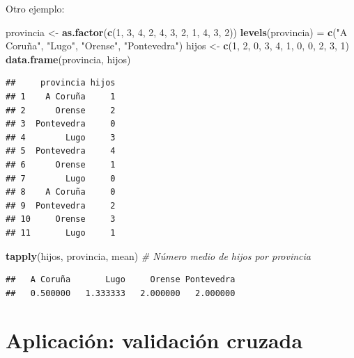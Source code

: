 \documentclass[]{book}
\newenvironment{Shaded}{\begin{snugshade}}{\end{snugshade}}
\newcommand{\KeywordTok}[1]{\textcolor[rgb]{0.13,0.29,0.53}{\textbf{#1}}}
\newcommand{\DecValTok}[1]{\textcolor[rgb]{0.00,0.00,0.81}{#1}}
\newcommand{\StringTok}[1]{\textcolor[rgb]{0.31,0.60,0.02}{#1}}
\newcommand{\CommentTok}[1]{\textcolor[rgb]{0.56,0.35,0.01}{\textit{#1}}}
\newcommand{\NormalTok}[1]{#1}
\begin{document}
Otro ejemplo:

\begin{Shaded}
\begin{Highlighting}[]
\NormalTok{provincia <-}\StringTok{ }\KeywordTok{as.factor}\NormalTok{(}\KeywordTok{c}\NormalTok{(}\DecValTok{1}\NormalTok{, }\DecValTok{3}\NormalTok{, }\DecValTok{4}\NormalTok{, }\DecValTok{2}\NormalTok{, }\DecValTok{4}\NormalTok{, }\DecValTok{3}\NormalTok{, }\DecValTok{2}\NormalTok{, }\DecValTok{1}\NormalTok{, }\DecValTok{4}\NormalTok{, }\DecValTok{3}\NormalTok{, }\DecValTok{2}\NormalTok{))}
\KeywordTok{levels}\NormalTok{(provincia) =}\StringTok{ }\KeywordTok{c}\NormalTok{(}\StringTok{"A Coruña"}\NormalTok{, }\StringTok{"Lugo"}\NormalTok{, }\StringTok{"Orense"}\NormalTok{, }\StringTok{"Pontevedra"}\NormalTok{)}
\NormalTok{hijos <-}\StringTok{ }\KeywordTok{c}\NormalTok{(}\DecValTok{1}\NormalTok{, }\DecValTok{2}\NormalTok{, }\DecValTok{0}\NormalTok{, }\DecValTok{3}\NormalTok{, }\DecValTok{4}\NormalTok{, }\DecValTok{1}\NormalTok{, }\DecValTok{0}\NormalTok{, }\DecValTok{0}\NormalTok{, }\DecValTok{2}\NormalTok{, }\DecValTok{3}\NormalTok{, }\DecValTok{1}\NormalTok{)}
\KeywordTok{data.frame}\NormalTok{(provincia, hijos)}
\end{Highlighting}
\end{Shaded}

\begin{verbatim}
##     provincia hijos
## 1    A Coruña     1
## 2      Orense     2
## 3  Pontevedra     0
## 4        Lugo     3
## 5  Pontevedra     4
## 6      Orense     1
## 7        Lugo     0
## 8    A Coruña     0
## 9  Pontevedra     2
## 10     Orense     3
## 11       Lugo     1
\end{verbatim}

\begin{Shaded}
\begin{Highlighting}[]
\KeywordTok{tapply}\NormalTok{(hijos, provincia, mean) }\CommentTok{# Número medio de hijos por provincia}
\end{Highlighting}
\end{Shaded}

\begin{verbatim}
##   A Coruña       Lugo     Orense Pontevedra 
##   0.500000   1.333333   2.000000   2.000000
\end{verbatim}

\section{Aplicación: validación
cruzada}\label{aplicacion-validacion-cruzada}
\end{document}
